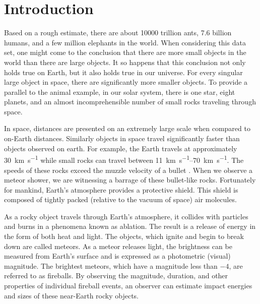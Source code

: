 \chapter{Introduction}

Based on a rough estimate, there are about \num{10000} trillion ants, \num{7.6} billion humans, and a few million elephants in the world.
When considering this data set, one might come to the conclusion that there are more small objects in the world than there are large objects.
It so happens that this conclusion not only holds true on Earth, but it also holds true in our universe.
For every singular large object in space, there are significantly more smaller objects.
To provide a parallel to the animal example, in our solar system, there is one star, eight planets, and an almost incomprehensible number of small rocks traveling through space. 

In space, distances are presented on an extremely large scale when compared to on-Earth distances.  
Similarly objects in space travel significantly faster than objects observed on earth.
For example, the Earth travels at approximately \SI{30}{\kilo\meter\per\second} while small rocks can travel between \SIrange{11}{70}{\kilo\meter\per\second}.  
The speeds of these rocks exceed the muzzle velocity of a bullet \cite{russell_photometry_2018}.
When we observe a meteor shower, we are witnessing a barrage of these bullet-like rocks.  
Fortunately for mankind, Earth’s atmosphere provides a protective shield.
This shield is composed of tightly packed (relative to the vacuum of space) air molecules.

As a rocky object travels through Earth’s atmosphere, it collides with particles and burns in a phenomena known as ablation.  
The result is a release of energy in the form of both heat and light.  
The objects, which ignite and begin to break down are called meteors.
As a meteor releases light, the brightness can be measured from Earth's surface and is expressed as a photometric (visual) magnitude. 
The brightest meteors, which have a magnitude less than $-4$, are referred to as fireballs.
By observing the magnitude, duration, and other properties of individual fireball events, an observer can estimate impact energies and sizes of these near-Earth rocky objects.

